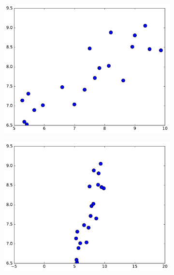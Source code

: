 \begin{figure}[H] %
\centering
\begin{subfigure}{.495\textwidth}
    \centering
    \includegraphics[width=\linewidth]{figures/dishonest_1.pdf}
\end{subfigure}
%
\begin{subfigure}{.495\textwidth}
    \centering
    \includegraphics[width=\linewidth]{figures/dishonest_2.pdf}
\end{subfigure}
\\
\begin{subfigure}{.495\textwidth}
    \centering

\end{subfigure}
\end{figure}
